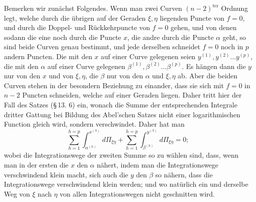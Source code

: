\documentclass[10pt]{article}
\begin{document}
Bemerken wir zunächst Folgendes. Wenn man zwei Curven \((n-2)^{\mathrm{ter}}\) Ordnung legt, welche durch die übrigen auf der Geraden \(\xi,\eta\) liegenden Puncte von \(f=0\), und durch die Doppel- und Rückkehrpuncte von \(f=0\) gehen, und von denen sodann die eine noch durch die Puncte \(x\), die andre durch die Puncte \(\alpha\) geht, so sind beide Curven genau bestimmt, und jede derselben schneidet \(f=0\) noch in \(p\) andern Puncten. Die mit den \(x\) auf einer Curve gelegenen seien \(y^{(1)},y^{(2)}\ldots y^{(p)}\), die mit den \(\alpha\) auf einer Curve gelegenen \(\beta^{(1)},\beta^{(2)}\ldots\beta^{(p)}\). Es hängen dann die \(y\) nur von den \(x\) und von \(\xi,\eta\), die \(\beta\) nur von den \(\alpha\) und \(\xi,\eta\) ab. Aber die beiden Curven stehen in der besondern Beziehung zu einander, dass sie sich mit \(f=0\) in \(n-2\) Puncten schneiden, welche auf einer Geraden liegen. Daher tritt hier der Fall des Satzes (\S\,13. 6) ein, wonach die Summe der entsprechenden Integrale dritter Gattung bei Bildung des Abel'schen Satzes nicht einer logarithmischen Function gleich wird, sondern verschwindet. Daher hat man
\[
\sum_{h=1}^{h=p}\int_{\alpha^{(h)}}^{x^{(h)}}d\Pi_{\xi\eta}
+\sum_{h=1}^{h=p}\int_{\beta^{(h)}}^{y^{(h)}}d\Pi_{\xi\eta}=0;
\]
wobei die Integrationswege der zweiten Summe so zu wählen sind, dass, wenn man in der ersten die \(x\) den \(\alpha\) nähert, indem man die Integrationswege verschwindend klein macht, sich auch die \(y\) den \(\beta\) so nähern, dass die Integrationswege verschwindend klein werden; und wo natürlich ein und derselbe Weg von \(\xi\) nach \(\eta\) von allen Integrationswegen nicht geschnitten wird.
\end{document}
